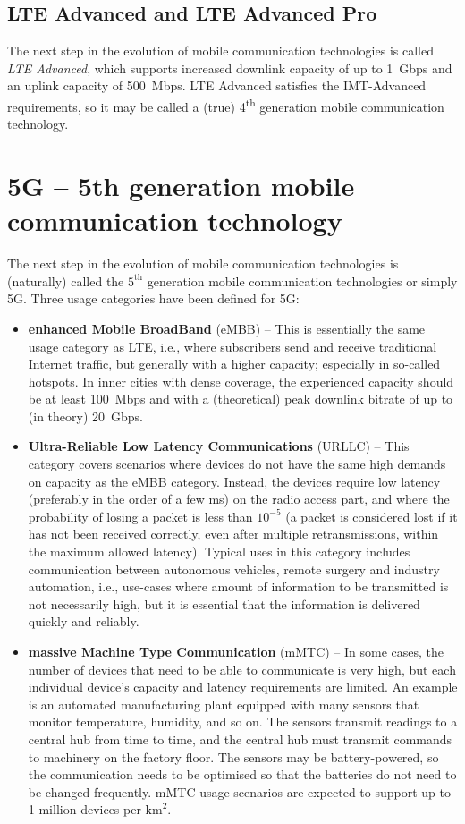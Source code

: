\subsection{LTE Advanced and LTE Advanced Pro}
The next step in the evolution of mobile communication technologies is called \emph{LTE Advanced}, which supports increased downlink capacity of up to 1~Gbps and an uplink capacity of 500~Mbps. LTE Advanced satisfies the IMT-Advanced requirements, so it may be called a (true) 4\textsuperscript{th} generation mobile communication technology.

\section{5G -- 5th generation mobile communication technology}
The next step in the evolution of mobile communication technologies is (naturally) called the $5^{\textrm{th}}$ generation mobile communication technologies or simply 5G. Three usage categories have been defined for 5G:
\begin{itemize}
%
\item \textbf{enhanced Mobile BroadBand} (eMBB) -- This is essentially the same usage category as LTE, i.e., where subscribers send and receive traditional Internet traffic, but generally with a higher capacity; especially in so-called hotspots. In inner cities with dense coverage, the experienced capacity should be at least 100~Mbps and with a (theoretical) peak downlink bitrate of up to (in theory) 20~Gbps.
%
\item \textbf{Ultra-Reliable Low Latency Communications} (URLLC) -- This category covers scenarios where devices do not have the same high demands on capacity as the eMBB category. Instead, the devices require low latency (preferably in the order of a few ms) on the radio access part, and where the probability of losing a packet is less than $10^{-5}$ (a packet is considered lost if it has not been received correctly, even after multiple retransmissions, within the maximum allowed latency). Typical uses in this category includes communication between autonomous vehicles, remote surgery and industry automation, i.e., use-cases where amount of information to be transmitted is not necessarily high, but it is essential that the information is delivered quickly and reliably.
%
\item \textbf{massive Machine Type Communication} (mMTC) -- In some cases, the number of devices that need to be able to communicate is very high, but each individual device's capacity and latency requirements are limited. An example is an automated manufacturing plant equipped with many sensors that monitor temperature, humidity, and so on. The sensors transmit readings to a central hub from time to time, and the central hub must transmit commands to machinery on the factory floor. The sensors may be battery-powered, so the communication needs to be optimised so that the batteries do not need to be changed frequently. mMTC usage scenarios are expected to support up to 1 million devices per $\textrm{km}^2$.
%
\end{itemize}

